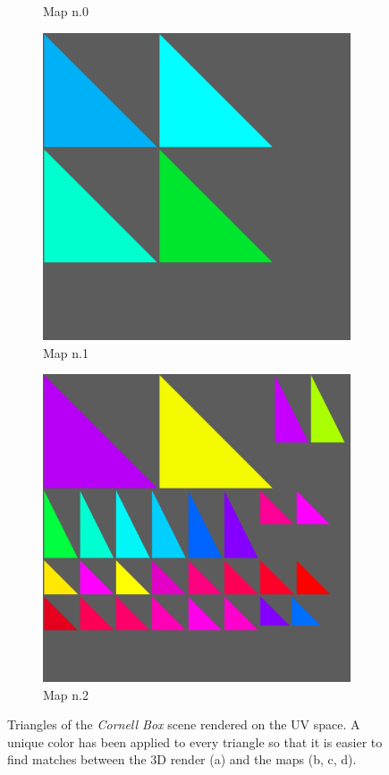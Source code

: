 \begin{figure}
\begin{subfigure}[t]{0.24\linewidth}
		\caption{Map n.0}
	\end{subfigure}
	\begin{subfigure}[t]{0.24\linewidth}
		\includegraphics[width=\textwidth]{chapters/chapter_thetool/uvmap_set1}
		\caption{Map n.1}
	\end{subfigure}
	\begin{subfigure}[t]{0.24\linewidth}
		\includegraphics[width=\textwidth]{chapters/chapter_thetool/uvmap_set2}
		\caption{Map n.2}
	\end{subfigure}

	\caption{Triangles of the \textit{Cornell Box} scene rendered on the UV space. A unique color has been applied to every triangle so that it is easier to find matches between the 3D render (a) and the maps (b, c, d).}
	\label{uvmap_gen}
\end{figure}

